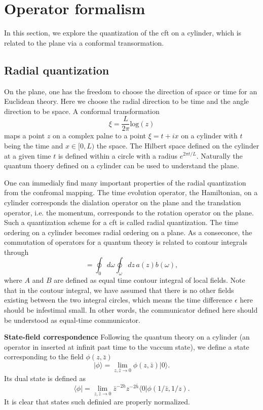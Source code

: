 \documentclass[submission, PhysLectNotes]{SciPost}
\begin{document}
\section{Operator formalism}
In this section, we explore the quantization of the cft on a cylinder, which is related to the plane via a conformal transormation.

\subsection{Radial quantization}
On the plane, one has the freedom to choose the direction of space or time for an Euclidean theory. Here we choose the radial direction to be time and the angle direction to be space. A conformal transformation
\begin{equation}
	\xi = \frac{L}{2\pi}\mathrm{log}\left(z\right)
\end{equation}
maps a point $z$ on a complex palne to a point $\xi=t+ix$ on a cylinder with $t$ being the time and $x\in[0,L)$ the space. The Hilbert space defined on the cylinder at a given time $t$ is defined within a circle with a radius $e^{2\pi t/L}$. Naturally the quantum thoery defined on a cylinder can be used to understand the plane.

One can immedialy find many important properties of the radial quantization from the confromal mapping. The time evolution operator, the Hamiltonian, on a cylinder corresponds the dialation operator on the plane and the translation operator, i.e.  the momentum, corresponds to the rotation operator on the plane. Such a quantization scheme for a cft is called radial quantization. The time ordering on a cylinder becomes radial ordering on a plane. As  a conseconce, the commutation of operators for a quantum theory is related to contour integrals through
\begin{equation}
	[A,B] = \oint_0 d\omega \oint_\omega dz \, a(z)b(\omega),
\end{equation}
where $A$ and $B$ are defined as equal time contour integral of local fields. Note that in the coutour integral, we have assumed that there is no other fields existing between the two integral circles, which means the time difference $\epsilon$ here should be infestimal small. In other words, the communicator defined here should be understood as equal-time communicator.

{\bf State-field correspondence} Following the quantum theory on a cylinder (an operator in inserted at infinit past time to the vaccum state), we define a state corresponding to the field $\phi(z,\bar{z})$
\begin{equation}
	\vert \phi \rangle = \lim_{z,\bar{z}\to 0}\phi(z,\bar{z})\vert0\rangle.
\end{equation}
Its dual state is defined as
\begin{equation}
	\langle \phi \vert = \lim_{z,\bar{z}\to 0} \bar{z}^{-2h}z^{-2\bar{h}} \langle 0 \vert \phi(1/\bar{z},1/z).
\end{equation}
It is clear that states such definied are properly normalized.
\end{document}
